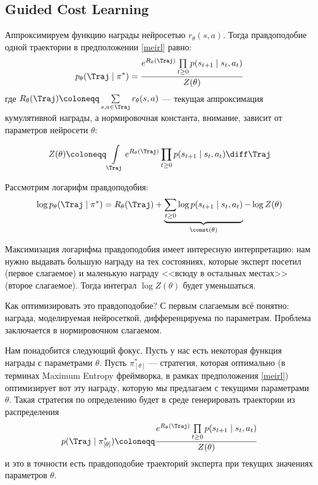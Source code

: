 \subsection{Guided Cost Learning}

Аппроксимируем функцию награды нейросетью $r_\theta(s, a)$. Тогда правдоподобие одной траектории в предположении \eqref{meirl} равно:
$$p_\theta(\Traj \mid \pi^*) = \frac{e^{R_{\theta}(\Traj)} \prod\limits_{t \ge 0}p(s_{t+1} \mid s_t, a_t)}{Z(\theta)}$$
где $R_{\theta}(\Traj) \coloneqq \sum\limits_{s, a \in \Traj} r_{\theta}(s, a)$ --- текущая аппроксимация кумулятивной награды, а нормировочная константа, внимание, зависит от параметров нейросети $\theta$:

\begin{equation}\label{irl_partionfunction}
Z(\theta) \coloneqq \int\limits_{\Traj} e^{R_{\theta}(\Traj)} \prod_{t \ge 0}p(s_{t+1} \mid s_t, a_t) \diff \Traj
\end{equation}

Рассмотрим логарифм правдоподобия:
\begin{equation}\label{irl_loglikelihood}
\log p_\theta(\Traj \mid \pi^*) = R_{\theta}(\Traj) + \underbrace{\sum_{t \ge 0} \log p(s_{t+1} \mid s_t, a_t)}_{\const(\theta)} - \log Z(\theta)
\end{equation}

Максимизация логарифма правдоподобия имеет интересную интерпретацию: нам нужно выдавать большую награду на тех состояниях, которые эксперт посетил (первое слагаемое) и маленькую награду <<всюду в остальных местах>> (второе слагаемое). Тогда интеграл $\log Z(\theta)$ будет уменьшаться.

Как оптимизировать это правдоподобие? С первым слагаемым всё понятно: награда, моделируемая нейросеткой, дифференцируема по параметрам. Проблема заключается в нормировочном слагаемом.

Нам понадобится следующий фокус. Пусть у нас есть некоторая функция награды с параметрами $\theta$. Пусть $\pi^*_{[\theta]}$ --- стратегия, которая оптимально (в терминах Maximum Entropy фреймворка, в рамках предположения \eqref{meirl}) оптимизирует вот эту награду, которую мы предлагаем с текущими параметрами $\theta$. Такая стратегия по определению будет в среде генерировать траектории из распределения
\begin{equation}\label{irl_currentoptimalpolicy}
p(\Traj \mid \pi^*_{[\theta]}) \coloneqq \frac{e^{R_{\theta}(\Traj)} \prod\limits_{t \ge 0}p(s_{t+1} \mid s_t, a_t)}{Z(\theta)}
\end{equation}
и это в точности есть правдоподобие траекторий эксперта при текущих значениях параметров $\theta$.

